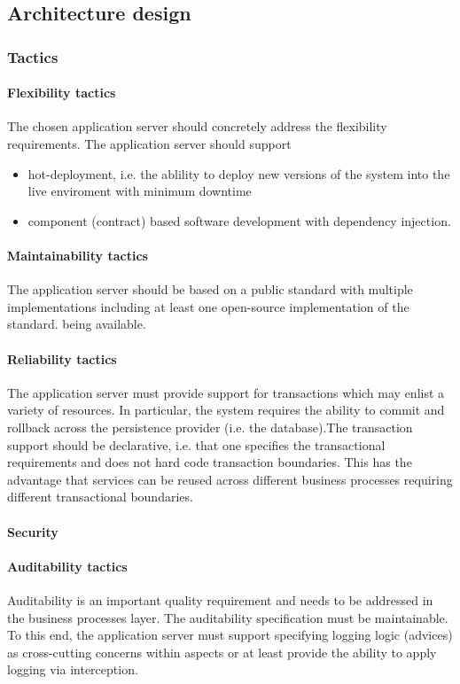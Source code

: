 \documentclass[a4paper,12pt]{report}
\begin{document}
\subsection {Architecture design}
\subsubsection {Tactics}
\paragraph {Flexibility tactics}
\hfill \break
The chosen application server should concretely address the flexibility requirements. The application server should support 
	\begin {itemize}
		\item hot-deployment, i.e. the ablility to deploy new versions of the system into the live enviroment with minimum downtime
		\item component (contract) based software development with dependency injection.
	\end {itemize}
 
\paragraph {Maintainability tactics}
\hfill \break
The application server should be based on a public standard with multiple implementations including at least one open-source implementation of the standard.
being available.

\paragraph {Reliability tactics}
\hfill \break
The application server must provide support for transactions which may enlist a variety of resources. In particular, the system requires the ability to commit and rollback across the persistence provider (i.e. the database).The transaction support should be declarative, i.e. that one specifies the transactional requirements and does not hard code transaction boundaries. This has the advantage that services can be reused across different business processes requiring different transactional boundaries. 

\paragraph {Security}
\hfill \break

\paragraph {Auditability tactics}
\hfill \break
Auditability is an important quality requirement and needs to be addressed in the business processes layer. The auditability specification must be maintainable. To this end, the application server must support specifying logging logic (advices) as cross-cutting concerns within aspects or at least provide the ability to apply logging via interception.
\end{document}
